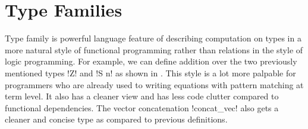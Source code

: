 \documentclass[format=sigplan,manuscript,review,screen,nonacm,margin=1in]{acmart}
\begin{document}



\section{Type Families}\label{sec:tf}
Type family is powerful language feature of describing computation on types in a more
natural style of functional programming rather than relations in the style of logic programming.
For example, we can define addition over the two previously mentioned types !Z! and !S n!
as shown in . This style is a lot more palpable for programmers
who are already used to writing equations with pattern matching at term level.
It also has a cleaner view and has less code clutter compared to functional dependencies.
The vector concatenation !concat_vec! also gets a cleaner and concise type as compared to previous definitions.
\end{document}
